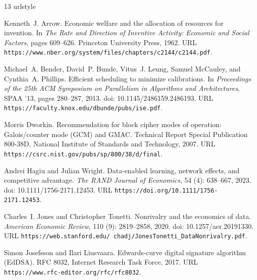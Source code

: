 \clearpage
\begin{thebibliography}{13}
\providecommand{\natexlab}[1]{#1}
\providecommand{\url}[1]{\texttt{#1}}
\expandafter\ifx\csname urlstyle\endcsname\relax
  \providecommand{\doi}[1]{doi: #1}\else
  \providecommand{\doi}{doi: \begingroup \urlstyle{rm}\Url}\fi

Kenneth~J. Arrow.
\newblock Economic welfare and the allocation of resources for invention.
\newblock In \emph{The Rate and Direction of Inventive Activity: Economic and
  Social Factors}, pages 609--626. Princeton University Press, 1962.
\newblock URL \url{https://www.nber.org/system/files/chapters/c2144/c2144.pdf}.

Michael~A. Bender, David~P. Bunde, Vitus~J. Leung, Samuel McCauley, and
  Cynthia~A. Phillips.
\newblock Efficient scheduling to minimize calibrations.
\newblock In \emph{Proceedings of the 25th ACM Symposium on Parallelism in
  Algorithms and Architectures}, SPAA '13, pages 280--287, 2013.
\newblock \doi{10.1145/2486159.2486193}.
\newblock URL \url{https://faculty.knox.edu/dbunde/pubs/ise.pdf}.

Morris Dworkin.
\newblock Recommendation for block cipher modes of operation: Galois/counter
  mode ({GCM}) and {GMAC}.
\newblock Technical Report Special Publication 800-38D, National Institute of
  Standards and Technology, 2007.
\newblock URL \url{https://csrc.nist.gov/pubs/sp/800/38/d/final}.

Andrei Hagiu and Julian Wright.
\newblock Data-enabled learning, network effects, and competitive advantage.
\newblock \emph{The RAND Journal of Economics}, 54 (4):
  638--667, 2023.
\newblock \doi{10.1111/1756-2171.12453}.
\newblock URL \url{https://doi.org/10.1111/1756-2171.12453}.

Charles~I. Jones and Christopher Tonetti.
\newblock Nonrivalry and the economics of data.
\newblock \emph{American Economic Review}, 110 (9):
  2819--2858, 2020.
\newblock \doi{10.1257/aer.20191330}.
\newblock URL
  \url{https://web.stanford.edu/~chadj/JonesTonetti_DataNonrivalry.pdf}.

Simon Josefsson and Ilari Liusvaara.
\newblock Edwards-curve digital signature algorithm ({EdDSA}).
\newblock RFC 8032, Internet Research Task Force, 2017.
\newblock URL \url{https://www.rfc-editor.org/rfc/rfc8032}.


\end{thebibliography}
